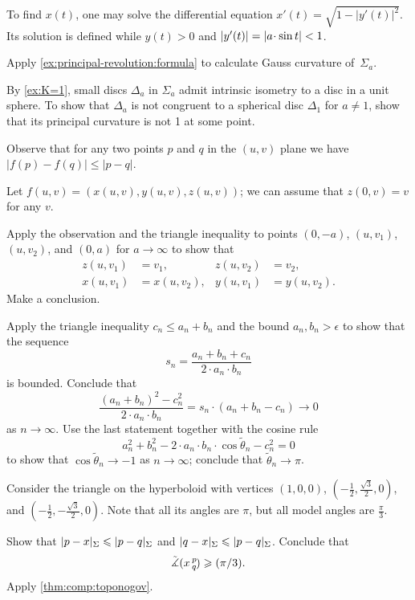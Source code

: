 To find $x(t)$, one may solve the differential equation
$x'(t)=\sqrt{1-|y'(t)|^2}$.
Its solution is defined while $y(t)>0$ and $|y'(t)|\z=|a\cdot \sin t|<1$.

Apply \ref{ex:principal-revolution:formula} to calculate Gauss curvature of~$\Sigma_a$.

By \ref{ex:K=1}, small discs $\Delta_a$ in $\Sigma_a$ admit intrinsic isometry to a disc in a unit sphere.
To show that $\Delta_a$ is not congruent to a spherical disc $\Delta_1$ for $a\ne 1$, show that its principal curvature is not 1 at some point. 


Observe that for any two points $p$ and $q$ in the $(u,v)$ plane we have $|f(p)-f(q)|\le |p-q|$.

Let $f(u,v)=(x(u,v),y(u,v),z(u,v))$;
we can assume that $z(0,v)=v$ for any $v$.

Apply the observation and the triangle inequality to points $(0,-a)$, $(u,v_1)$, $(u,v_2)$, and $(0,a)$ for $a\to \infty$ to show that 
\begin{align*}
z(u,v_1)&=v_1,
&
z(u,v_2)&=v_2,
\\
x(u,v_1)&=x(u,v_2),
&
y(u,v_1)&=y(u,v_2).
\end{align*}
Make a conclusion.



\setcounter{eqtn}{0}

Apply the triangle inequality $c_n\le a_n+b_n$ and the bound $a_n,b_n>\epsilon$ to show that the sequence 
\[s_n=\frac{a_n+b_n+c_n}{2\cdot a_n\cdot b_n}\]
is bounded.
Conclude that 
\[\frac{(a_n+b_n)^2-c_n^2}{2\cdot a_n\cdot b_n}=s_n\cdot (a_n+b_n-c_n)\to 0\]
as $n\to\infty$.
Use the last statement together with the cosine rule
\[a_n^2+b_n^2-2\cdot a_n\cdot b_n\cdot\cos\tilde\theta_n -c_n^2=0\]
to show that $\cos\tilde\theta_n\to -1$ as $n\to\infty$;
conclude that $\tilde\theta_n\to \pi$.

Consider the triangle on the hyperboloid with vertices $(1,0,0)$, $(-\tfrac{1}2, \tfrac{\sqrt{3}}2,0)$, and $(-\tfrac{1}2,-\tfrac{\sqrt{3}}2,0)$.
Note that all its angles are $\pi$, but all model angles are $\tfrac{\pi}3$.

Show that $\dist{p}{x}\Sigma\le \dist{p}{q}\Sigma$ and $\dist{q}{x}\Sigma\le \dist{p}{q}\Sigma$.
Conclude that
\[\tilde\measuredangle(x\,{}^{p}_{q}\hspace{-0.2ex})\geqslant (\pi/3).\]
Apply \ref{thm:comp:toponogov}.

